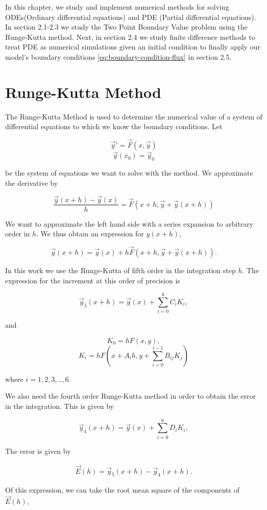 In this chapter, we study and implement numerical methods for solving ODEs(Ordinary differential equations) and PDE (Partial differential equations). In section 2.1-2.3 we study the Two Point Boundary Value problem using the Runge-Kutta method. Next, in section 2.4 we study finite difference methods to treat PDE as numerical simulations given an initial condition to finally apply our model's boundary conditions \ref{eq:boundary-condition-flux} in section 2.5.
\section{Runge-Kutta Method}
\label{sec:run_kut}

The Runge-Kutta Method is used to determine the numerical value of a system of differential equations to which we know the boundary conditions. Let 

$$\vec{y}' = \vec{F}(x, \vec{y})$$
$$\vec{y}(x_0) = \vec{y}_0$$

be the system of equations we want to solve with the method. We approximate the derivative by

$$\frac{\vec{y}(x+h)-\vec{y}(x)}{h} = \vec{F}(x + h, \vec{y}+\vec{y}(x+h))$$

We want to approximate the left hand side with a series expansion to arbitrary order in $h$. We thus obtain an expression for $y(x+h)$,

$$\vec{y}(x+h)=\vec{y}(x)+ h\vec{F}(x + h, \vec{y}+\vec{y}(x+h)).$$

In this work we use the Runge-Kutta of fifth order in the integration step $h$. The expression for the increment at this order of precision is

$$\vec{y}_5(x+h) = \vec{y}(x) + \sum_{i=0}^{6} C_{i} K_i,$$

and

$$K_0 = hF(x,y),$$
$$K_i = hF(x+A_ih,y+\sum_{i=0}^{i-1} B_{ij} K_j)$$

where $i = 1,2,3, .. , 6 $.

We also need the fourth order Runge-Kutta method in order to obtain the error in the integration. This is given by

$$\vec{y}_4(x+h) = \vec{y}(x) + \sum_{i=0}^{6} D_{i} K_i,$$

The error is given by 

\begin{eqnarray}
\vec{E}(h) = \vec{y}_5(x+h) - \vec{y}_4(x+h).
\end{eqnarray}

Of this expression, we can take the root mean square of the components of $\vec{E}(h)$,

